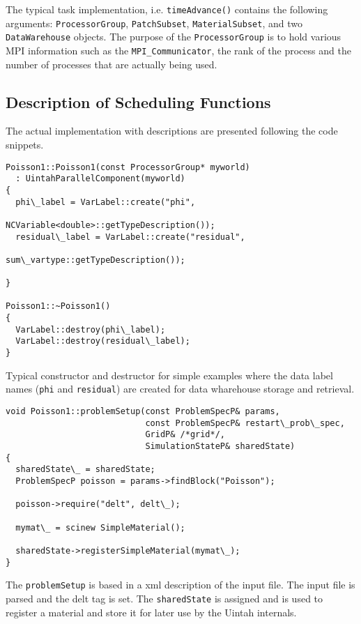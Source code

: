 \documentclass[12pt]{report}
\begin{document}
The typical task implementation, i.e. \texttt{timeAdvance()} contains
the following arguments: \texttt{ProcessorGroup},
\texttt{PatchSubset}, \texttt{MaterialSubset}, and two
\texttt{DataWarehouse} objects.  The purpose of the
\texttt{ProcessorGroup} is to hold various MPI information such as the
\texttt{MPI\_Communicator}, the rank of the process and the number of
processes that are actually being used.

\subsection{Description of Scheduling Functions}

The actual implementation with descriptions are presented following
the code snippets.

\begin{verbatim}
Poisson1::Poisson1(const ProcessorGroup* myworld)
  : UintahParallelComponent(myworld)
{
  phi\_label = VarLabel::create("phi", 
                               NCVariable<double>::getTypeDescription());
  residual\_label = VarLabel::create("residual", 
                                    sum\_vartype::getTypeDescription());

}

Poisson1::~Poisson1()
{
  VarLabel::destroy(phi\_label);
  VarLabel::destroy(residual\_label);
}

\end{verbatim}

Typical constructor and destructor for simple examples where the data
label names (\texttt{phi} and \texttt{residual}) are created for data
wharehouse storage and retrieval.

\begin{verbatim}
void Poisson1::problemSetup(const ProblemSpecP& params,
                            const ProblemSpecP& restart\_prob\_spec,
                            GridP& /*grid*/,
                            SimulationStateP& sharedState)
{
  sharedState\_ = sharedState;
  ProblemSpecP poisson = params->findBlock("Poisson");

  poisson->require("delt", delt\_);

  mymat\_ = scinew SimpleMaterial();

  sharedState->registerSimpleMaterial(mymat\_);
}
\end{verbatim}

The \texttt{problemSetup} is based in a xml description of the input
file.  The input file is parsed and the delt tag is set.  The
\texttt{sharedState} is assigned and is used to register a material
and store it for later use by the Uintah internals.
\end{document}
